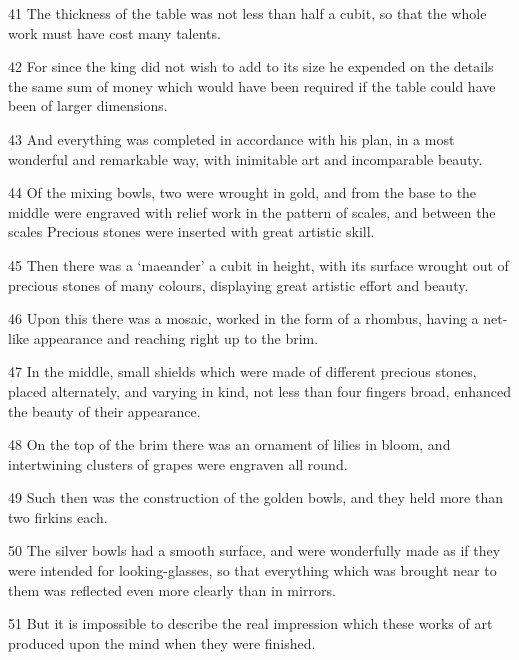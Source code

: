 \par 41 The thickness of the table was not less than half a cubit, so that the whole work must have cost many talents.

\par 42 For since the king did not wish to add to its size he expended on the details the same sum of money which would have been required if the table could have been of larger dimensions.

\par 43 And everything was completed in accordance with his plan, in a most wonderful and remarkable way, with inimitable art and incomparable beauty.

\par 44 Of the mixing bowls, two were wrought in gold, and from the base to the middle were engraved with relief work in the pattern of scales, and between the scales Precious stones were inserted with great artistic skill.

\par 45 Then there was a ‘maeander’ a cubit in height, with its surface wrought out of precious stones of many colours, displaying great artistic effort and beauty.

\par 46 Upon this there was a mosaic, worked in the form of a rhombus, having a net-like appearance and reaching right up to the brim.

\par 47 In the middle, small shields which were made of different precious stones, placed alternately, and varying in kind, not less than four fingers broad, enhanced the beauty of their appearance.

\par 48 On the top of the brim there was an ornament of lilies in bloom, and intertwining clusters of grapes were engraven all round.

\par 49 Such then was the construction of the golden bowls, and they held more than two firkins each.

\par 50 The silver bowls had a smooth surface, and were wonderfully made as if they were intended for looking-glasses, so that everything which was brought near to them was reflected even more clearly than in mirrors.

\par 51 But it is impossible to describe the real impression which these works of art produced upon the mind when they were finished.

